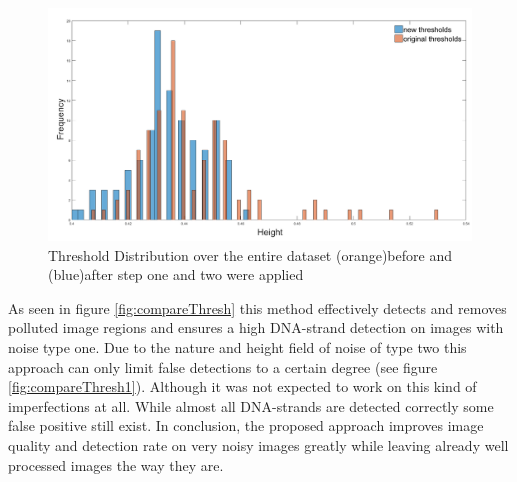 \documentclass{article}
\begin{document}
\begin{figure}[!htb]
	\includegraphics[width=1\linewidth]{thresholds.png}
	\caption{Threshold Distribution over the entire dataset (orange)before and (blue)after step one and two were applied}%
	\label{fig:HistogramThresholds}
	\end{figure}
	As seen in figure \ref{fig:compareThresh} this method effectively detects and removes polluted image regions and ensures a high DNA-strand detection on images with noise type one.
Due to the nature and height field of noise of type two this approach can only limit false detections to a certain degree (see figure \ref{fig:compareThresh1}).
Although it was not expected to work on this kind of imperfections at all. While almost all DNA-strands are detected correctly some false positive still exist.
In conclusion, the proposed approach improves image quality and detection rate on very noisy images greatly while leaving already well processed images the way they are.
\end{document}
